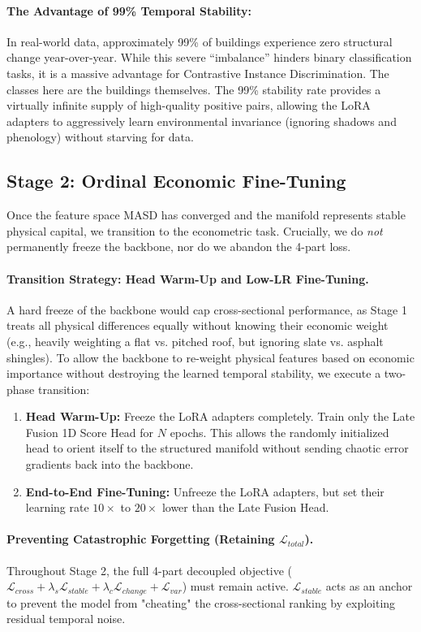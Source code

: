 \documentclass[12pt]{article}
\begin{document}
\paragraph{The Advantage of 99\% Temporal Stability:} 
In real-world data, approximately 99\% of buildings experience zero structural change year-over-year. While this severe ``imbalance'' hinders binary classification tasks, it is a massive advantage for Contrastive Instance Discrimination. The classes here are the buildings themselves. The 99\% stability rate provides a virtually infinite supply of high-quality positive pairs, allowing the LoRA adapters to aggressively learn environmental invariance (ignoring shadows and phenology) without starving for data.

\subsection{Stage 2: Ordinal Economic Fine-Tuning}
Once the feature space MASD has converged and the manifold represents stable physical capital, we transition to the econometric task. Crucially, we do \textit{not} permanently freeze the backbone, nor do we abandon the 4-part loss.

\paragraph{Transition Strategy: Head Warm-Up and Low-LR Fine-Tuning.}
A hard freeze of the backbone would cap cross-sectional performance, as Stage 1 treats all physical differences equally without knowing their economic weight (e.g., heavily weighting a flat vs. pitched roof, but ignoring slate vs. asphalt shingles). To allow the backbone to re-weight physical features based on economic importance without destroying the learned temporal stability, we execute a two-phase transition:
\begin{enumerate}
    \item \textbf{Head Warm-Up:} Freeze the LoRA adapters completely. Train only the Late Fusion 1D Score Head for $N$ epochs. This allows the randomly initialized head to orient itself to the structured manifold without sending chaotic error gradients back into the backbone.
    \item \textbf{End-to-End Fine-Tuning:} Unfreeze the LoRA adapters, but set their learning rate $10\times$ to $20\times$ lower than the Late Fusion Head.
\end{enumerate}

\paragraph{Preventing Catastrophic Forgetting (Retaining $\mathcal{L}_{total}$).}
Throughout Stage 2, the full 4-part decoupled objective ($\mathcal{L}_{cross} + \lambda_s \mathcal{L}_{stable} + \lambda_c \mathcal{L}_{change} + \mathcal{L}_{var}$) must remain active. $\mathcal{L}_{stable}$ acts as an anchor to prevent the model from "cheating" the cross-sectional ranking by exploiting residual temporal noise. 
\end{document}
